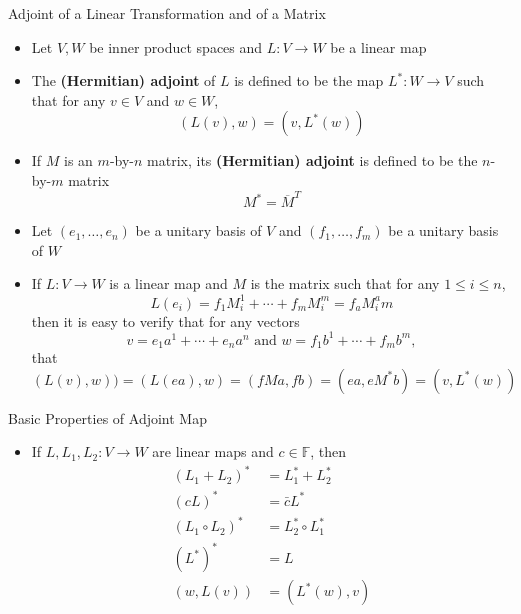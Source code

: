 \documentclass[usenames,dvipsnames,10pt]{beamer}
\newcommand\F{\mathbb{F}}
\begin{document}
\begin{frame}
  {Adjoint of a Linear Transformation and of a Matrix}

  \begin{itemize}
  \item Let $V, W$ be inner product spaces and $L: V \rightarrow W$ be a linear map
  \item The {\bf (Hermitian) adjoint} of $L$ is defined to be the map
    $L^*: W \rightarrow V$ such that for any $v \in V$ and $w \in W$,
    \[
      (L(v),w) = (v,L^*(w))
    \]
  \item If $M$ is an $m$-by-$n$ matrix, its {\bf (Hermitian) adjoint} is defined to be the $n$-by-$m$ matrix
    \[
      M^* = \overline{M}^T
    \]
  \item Let $(e_1, \dots, e_n)$ be a unitary basis of $V$ and $(f_1, \dots, f_m)$ be a unitary basis of $W$
  \item If $L: V \rightarrow W$ is a linear map and $M$ is the matrix such that for any $1 \le i \le n$,
    \[
      L(e_i) = f_1M^1_i + \cdots + f_mM^m_i = f_aM^a_im
    \]
    then it is easy to verify that for any vectors
    \[
      v = e_1a^1+\cdots + e_na^n\text{ and }w = f_1b^1+\cdots+f_mb^m,
    \]
    that
    \[
      (L(v),w)) = (L(ea),w) = (fMa,fb) = (ea,eM^*b) = (v,L^*(w))
    \]
  \end{itemize}
\end{frame}

\begin{frame}
  {Basic Properties of Adjoint Map}

  \begin{itemize}
  \item If $L, L_1, L_2: V \rightarrow W$ are linear maps and $c \in \F$, then
    \begin{align*}
      (L_1+L_2)^* &= L_1^* + L_2^*\\
      (cL)^* &= \bar{c}L^*\\
      (L_1\circ L_2)^* &= L_2^*\circ L_1^*\\
      (L^*)^* &= L\\
      (w,L(v)) &= (L^*(w),v)
    \end{align*}
  \end{itemize}
\end{frame}
\end{document}
